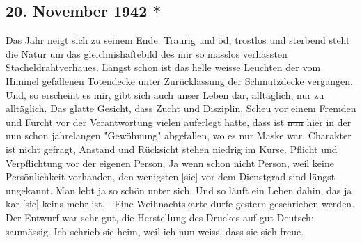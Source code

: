 \subsection{20. November 1942 *}

Das Jahr neigt sich zu seinem Ende.
Traurig und \"{o}d, trostlos und sterbend steht die Natur um das gleichnishaftebild des mir so masslos verhassten Stacheldrahtverhaues.
L\"{a}ngst schon ist das helle weisse Leuchten der vom Himmel gefallenen Totendecke unter Zur\"{u}cklassung der Schmutzdecke vergangen.
Und, so erscheint es mir, gibt sich auch unser Leben dar, allt\"{a}glich, nur zu allt\"{a}glich.
Das glatte Gesicht, dass Zucht und Disziplin, Scheu vor einem Fremden und Furcht vor der Verantwortung vielen auferlegt hatte, dass ist \st{nun} hier in der nun schon jahrelangen "Gew\"{o}hnung" abgefallen, wo es nur Maske war.
Charakter ist nicht gefragt, Anstand und R\"{u}cksicht stehen niedrig im Kurse.
Pflicht und Verpflichtung vor der eigenen Person, Ja wenn schon nicht Person, weil keine Pers\"{o}nlichkeit vorhanden, den wenigsten{\color{red} [sic] } vor dem Dienstgrad sind l\"{a}ngst ungekannt.
Man lebt ja so sch\"{o}n unter sich.
Und so l\"{a}uft ein Leben dahin, das ja kar{\color{red} [sic] } keins mehr ist.
- Eine Weihnachtskarte durfe gestern geschrieben werden.
Der Entwurf war sehr gut, die Herstellung des Druckes auf gut Deutsch: saum\"{a}ssig.
Ich schrieb sie heim, weil ich nun weiss, dass sie sich freue.

\clearpage
